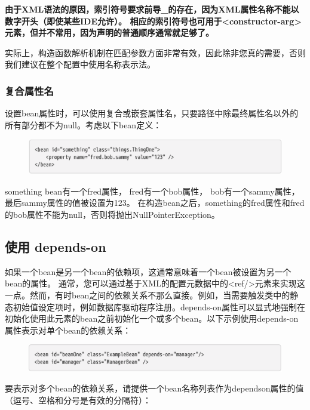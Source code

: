 \textbf{由于XML语法的原因，索引符号要求前导\_的存在，因为XML属性名称不能以数字开头（即使某些IDE允许）。 相应的索引符号也可用于<constructor-arg>元素，但并不常用，因为声明的普通顺序通常就足够了。}

实际上，构造函数解析机制在匹配参数方面非常有效，因此除非您真的需要，否则我们建议在整个配置中使用名称表示法。

\subsubsection{复合属性名}
设置bean属性时，可以使用复合或嵌套属性名，只要路径中除最终属性名以外的所有部分都不为null。考虑以下bean定义：

\begin{figure}[ht]
    \centering
    \includegraphics[width=1\linewidth]{./Figure/IMG_code_54.png}
\end{figure}

something bean有一个fred属性，
fred有一个bob属性，
bob有一个sammy属性，最后sammy属性的值被设置为123。
在构造bean之后，something的fred属性和fred的bob属性不能为null，否则将抛出NullPointerException。

\subsection{使用 depends-on}
如果一个bean是另一个bean的依赖项，这通常意味着一个bean被设置为另一个bean的属性。
通常，您可以通过基于XML的配置元数据中的<ref/>元素来实现这一点。然而，有时bean之间的依赖关系不那么直接。例如，当需要触发类中的静态初始值设定项时，例如数据库驱动程序注册。depends-on属性可以显式地强制在初始化使用此元素的bean之前初始化一个或多个bean。以下示例使用depends-on属性表示对单个bean的依赖关系：

\begin{figure}[ht]
    \centering
    \includegraphics[width=1\linewidth]{./Figure/IMG_code_55.png}
\end{figure}

要表示对多个bean的依赖关系，请提供一个bean名称列表作为dependson属性的值（逗号、空格和分号是有效的分隔符）：


